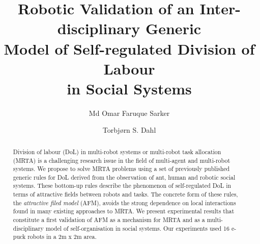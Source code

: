 \documentclass{llncs}
\begin{document}
\title{Robotic Validation of an Inter-disciplinary Generic\\
Model of Self-regulated Division of Labour\\ in Social Systems}
\author{Md Omar Faruque Sarker \and
Torbj{\o}rn S. Dahl %
}
\maketitle
\begin{abstract}
Division of labour (DoL) in multi-robot systems or multi-robot task allocation (MRTA) is a challenging research issue in the field of multi-agent and multi-robot systems.
We propose to solve MRTA problems using a set of previously published generic rules for DoL derived from the observation of ant, human and robotic social systems.
These bottom-up rules describe the phenomenon of self-regulated DoL in terms of attractive fields between robots and tasks.
The concrete form of these rules, the \textit{attractive filed model} (AFM), avoids the strong dependence on local interactions found in many existing approaches to MRTA.
We present experimental results that constitute a first validation of AFM as a mechanism for MRTA and as a multi-disciplinary model of self-organisation in social systems.
Our experiments used 16 e-puck robots in a 2m x 2m area.
\end{abstract}
\end{document}

